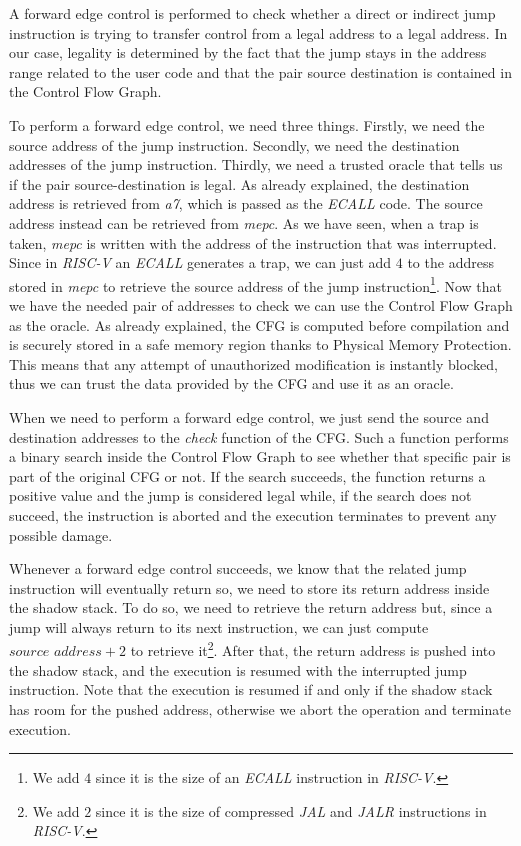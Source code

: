 A forward edge control is performed to check whether a direct or indirect jump instruction
is trying to transfer control from a legal address to a legal address. In our
case, legality is determined by the fact that the jump stays in the address range
related to the user code and that the pair source destination is contained in the
Control Flow Graph.

To perform a forward edge control, we need three things. Firstly, we need the
source address of the jump instruction. Secondly, we need the destination
addresses of the jump instruction. Thirdly, we need a trusted oracle that tells
us if the pair source-destination is legal. As already explained, the
destination address is retrieved from \textit{a7}, which is passed as the
\textit{ECALL} code. The source address instead can be retrieved from \textit{mepc}.
As we have seen, when a trap is taken, \textit{mepc} is written with the address
of the instruction that was interrupted. Since in \textit{RISC-V} an \textit{ECALL}
generates a trap, we can just add $4$ to the address stored in \textit{mepc} to
retrieve the source address of the jump instruction\footnote{We add $4$ since it
is the size of an \textit{ECALL} instruction in \textit{RISC-V}.}. Now that we
have the needed pair of addresses to check we can use the Control Flow Graph as
the oracle. As already explained, the CFG is computed before compilation and is
securely stored in a safe memory region thanks to Physical Memory Protection. This
means that any attempt of unauthorized modification is instantly blocked, thus
we can trust the data provided by the CFG and use it as an oracle.

When we need to perform a forward edge control, we just send the source and destination
addresses to the \textit{check} function of the CFG. Such a function performs a binary
search inside the Control Flow Graph to see whether that specific pair is part of
the original CFG or not. If the search succeeds, the function returns a positive
value and the jump is considered legal while, if the search does not succeed, the
instruction is aborted and the execution terminates to prevent any possible damage.

Whenever a forward edge control succeeds, we know that the related jump
instruction will eventually return so, we need to store its return address inside
the shadow stack. To do so, we need to retrieve the return address but, since a
jump will always return to its next instruction, we can just compute $\textit{source
address}+ 2$ to retrieve it\footnote{We add $2$ since it is the size of
compressed \textit{JAL} and \textit{JALR} instructions in \textit{RISC-V}.}. After
that, the return address is pushed into the shadow stack, and the execution is resumed
with the interrupted jump instruction. Note that the execution is resumed if and
only if the shadow stack has room for the pushed address, otherwise we abort the
operation and terminate execution.

